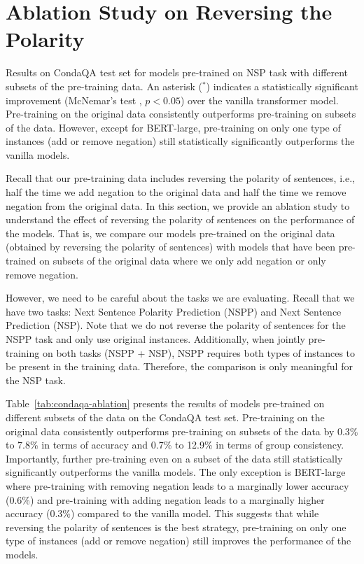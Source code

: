 \section{Ablation Study on Reversing the Polarity}
\label{app:ablation}
\begin{table*}[h!]
    \centering
    
    \caption{
        Results on CondaQA test set for models pre-trained on NSP task with different subsets of the pre-training data.
        An asterisk ($^{\ast}$) indicates a statistically significant improvement (McNemar's test \cite{mcnemar1947note}, $p < 0.05$)
        over the vanilla transformer model.
        Pre-training on the original data consistently outperforms pre-training on subsets of the data.
        However, except for {BERT-large}, pre-training on only one type of instances (add or remove negation) still statistically significantly outperforms the vanilla models.
        \label{tab:condaqa-ablation}
    }
\end{table*}

Recall that our pre-training data includes reversing the polarity of sentences, 
i.e., half the time we add negation to the original data and half the time we remove negation from the original data.
In this section, we provide an ablation study to understand the effect of reversing the polarity of sentences on the performance of the models.
That is, 
we compare our models pre-trained on the original data (obtained by reversing the polarity of sentences) 
with models that have been pre-trained on subsets of the original data where we only add negation or only remove negation.

However,
we need to be careful about the tasks we are evaluating.
Recall that we have two tasks: Next Sentence Polarity Prediction (NSPP) and Next Sentence Prediction (NSP).
Note that we do not reverse the polarity of sentences for the NSPP task and only use original instances.
Additionally, when jointly pre-training on both tasks (NSPP + NSP), NSPP requires both types of instances to be present in the training data.
Therefore, the comparison is only meaningful for the NSP task. 

Table~\ref{tab:condaqa-ablation} presents the results of models pre-trained on different subsets of the data on the CondaQA test set.
Pre-training on the original data consistently outperforms pre-training on subsets of the data by 0.3\% to 7.8\% in terms of accuracy 
and 0.7\% to 12.9\% in terms of group consistency. 
Importantly, 
further pre-training even on a subset of the data still statistically significantly outperforms the vanilla models. 
The only exception is {BERT-large} where pre-training with removing negation leads to a marginally lower accuracy (0.6\%)
and pre-training with adding negation leads to a marginally higher accuracy (0.3\%) compared to the vanilla model.
This suggests that while reversing the polarity of sentences is the best strategy,
pre-training on only one type of instances (add or remove negation) still improves the performance of the models.

